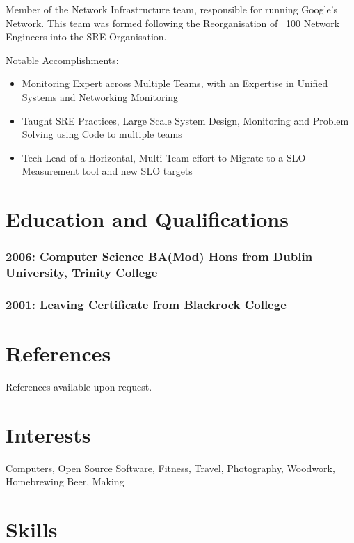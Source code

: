 \documentclass[a4paper, 10pt] {article}
\begin{document}
Member of the Network Infrastructure team, responsible for running Google's Network. This team was formed
following the Reorganisation of ~100 Network Engineers into the SRE Organisation.

\vspace{5mm} %

Notable Accomplishments:

\begin{itemize}
  \item Monitoring Expert across Multiple Teams, with an Expertise in Unified Systems and Networking Monitoring
  \item Taught SRE Practices, Large Scale System Design, Monitoring and Problem Solving using Code to multiple teams
  \item Tech Lead of a Horizontal, Multi Team effort to Migrate to a SLO Measurement tool and new SLO targets
\end{itemize}

\section*{Education and Qualifications}

\subsubsection*{2006: Computer Science BA(Mod) Hons from Dublin University, Trinity College}

\subsubsection*{2001: Leaving Certificate from Blackrock College}

\section*{References}

References available upon request.

\section*{Interests}

Computers, Open Source Software, Fitness, Travel, Photography, Woodwork, Homebrewing Beer, Making

\section*{Skills}
\end{document}

